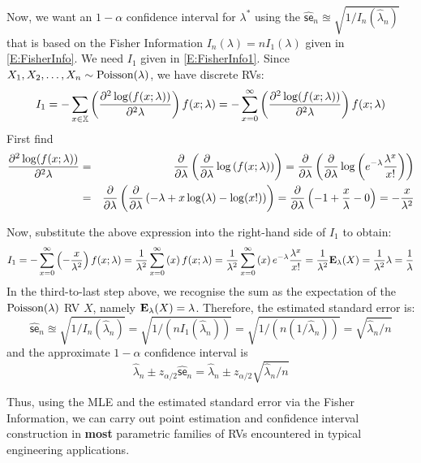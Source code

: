 \begin{example}
Now, we want an $1-\alpha$ confidence interval for $\lambda^*$ using the $\widehat{\mathsf{se}}_n \approxeq \sqrt{1/I_n(\widehat{\lambda}_n)}$ that is based on the Fisher Information $I_n(\lambda) = n I_1(\lambda)$ given in \eqref{E:FisherInfo}.  We need $I_1$ given in \eqref{E:FisherInfo1}.  Since $X_1,X_2,\ldots,X_n \sim \mbox{{\rm Poisson}}(\lambda)$, we have discrete RVs:
\[
I_1 = -\sum_{x \in \mathbb{X}}  \left( \frac{\partial^2 \log (f(x;\lambda))}{\partial^2 \lambda} \right) f(x;\lambda) = -\sum_{x =0}^{\infty}  \left( \frac{\partial^2 \log (f(x;\lambda))}{\partial^2 \lambda} \right) f(x;\lambda)
\]
First find 
\begin{eqnarray}
\frac{\partial^2 \log (f(x;\lambda))}{\partial^2 \lambda}
&=& \frac{\partial}{\partial \lambda} \left( \frac{\partial} {\partial \lambda} \log \left(  f(x;\lambda) \right
) \right)
=  \frac{\partial}{\partial \lambda} \left( \frac{\partial} {\partial \lambda} \log \left( e^{-\lambda} \frac{\lambda^x}{x!} \right) \right) \notag \\
&=& \frac{\partial}{\partial \lambda} \left( \frac{\partial} {\partial \lambda} \left( -\lambda + x \log(\lambda)-\log({x!}) \right) \right)
= \frac{\partial}{\partial \lambda} \left( -1 + \frac{x}{\lambda}-0 \right)
= -\frac{x}{\lambda^2} \notag
\end{eqnarray}
\end{example}
Now, substitute the above expression into the right-hand side of $I_1$ to obtain:
\[
I_1= - \sum_{x=0}^{\infty} \left( -\frac{x}{\lambda^2} \right) f(x;\lambda)
= \frac{1}{\lambda^2} \sum_{x=0}^{\infty} \left( x \right) f(x;\lambda)
= \frac{1}{\lambda^2} \sum_{x=0}^{\infty} \left( x \right) e^{-\lambda} \frac{\lambda^x}{x!} 
=  \frac{1}{\lambda^2} \mathbf{E}_{\lambda}(X)
= \frac{1}{\lambda^2} \lambda
=\frac{1}{\lambda}
\]
In the third-to-last step above, we recognise the sum as the expectation of the $\mbox{{\rm Poisson}}(\lambda)$ RV $X$, namely $\mathbf{E}_{\lambda}(X)=\lambda$.  Therefore, the estimated standard error is:
\[
\widehat{\mathsf{se}}_n \approxeq \sqrt{1/I_n(\widehat{\lambda}_n)}
= \sqrt{1/(n I_1(\widehat{\lambda}_n))}
= \sqrt{1/(n (1/\widehat{\lambda}_n))}
= \sqrt{\widehat{\lambda}_n/n}
\]
and the approximate $1-\alpha$ confidence interval is
\[
\widehat{\lambda}_n \pm z_{\alpha/2} \widehat{\mathsf{se}}_n 
= \widehat{\lambda}_n \pm z_{\alpha/2} \sqrt{\widehat{\lambda}_n/n}
\]

Thus, using the MLE and the estimated standard error via the Fisher Information, we can carry out point estimation and confidence interval construction in {\bf most} parametric families of RVs encountered in typical engineering applications.  

